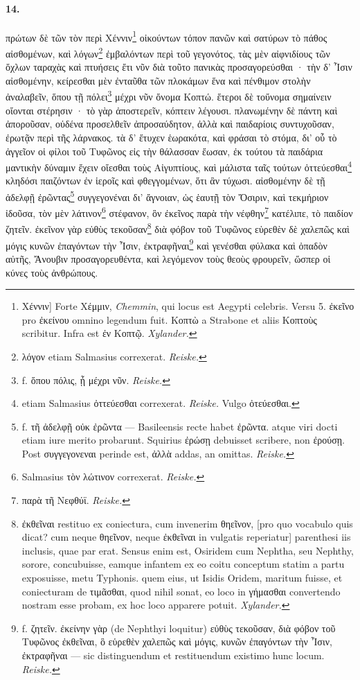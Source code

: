 \documentclass[a4paper, 11pt, oneside, polutonikogreek, german, landscape]{article}
\begin{document}
\paragraph{14.}
πρώτων δὲ τῶν τὸν περὶ Χέννιν\footnote{Χέννιν] Forte Χέμμιν, \emph{Chemmin}, qui locus est Aegypti celebris. Versu 5. ἐκεῖνο pro ἐκείνου omnino legendum fuit. Κοπτὼ a Strabone et aliis Κοπτοὺς scribitur. Infra est ἐν Κοπτῷ. \emph{Xylander.}} οἰκούντων τόπον πανῶν καὶ σατύρων τὸ πάθος αἰσθομένων, καὶ λόγων\footnote{λόγον etiam Salmasius correxerat. \emph{Reiske.}} ἐμβαλόντων περὶ τοῦ γεγονότος, τὰς μὲν αἰφνιδίους τῶν ὄχλων ταραχὰς καὶ πτυήσεις ἔτι νῦν διὰ τοῦτο πανικὰς προσαγορεύσθαι · τὴν δ' Ἶσιν αἰσθομένην, κείρεσθαι μὲν ἐνταῦθα τῶν πλοκάμων ἕνα καὶ πένθιμον στολὴν ἀναλαβεῖν, ὅπου τῇ πόλει\footnote{f. ὅπου πόλις, ᾗ μέχρι νῦν. \emph{Reiske.}} μέχρι νῦν ὄνομα Κοπτώ. ἕτεροι δὲ τοὔνομα σημαίνειν οἴονται στέρησιν · τὸ γὰρ ἀποστερεῖν, κόπτειν λέγουσι. πλανωμένην δὲ πάντη καὶ ἀποροῦσαν, οὐδένα προσελθεῖν ἀπροσαύδητον, ἀλλὰ καὶ παιδαρίοις συντυχοῦσαν, ἐρωτᾷν περὶ τῆς λάρνακος. τὰ δ' ἔτυχεν ἑωρακότα, καὶ φράσαι τὸ στόμα, δι' οὗ τὸ ἀγγεῖον οἱ φίλοι τοῦ Τυφῶνος εἰς τὴν θάλασσαν ἔωσαν, ἐκ τούτου τὰ παιδάρια μαντικὴν δύναμιν ἔχειν οἴεσθαι τοὺς Αἰγυπτίους, καὶ μάλιστα ταῖς τούτων ὀττεύεσθαι\footnote{etiam Salmasius ὀττεύεσθαι correxerat. \emph{Reiske.} Vulgo ὀτεύεσθαι.} κληδόσι παιζόντων ἐν ἱεροῖς καὶ φθεγγομένων, ὅτι ἂν τύχωσι. αἰσθομένην δὲ τῇ ἀδελφῇ ἐρῶντας\footnote{f. τῆ ἀδελφῇ οὐκ ἐρῶντα --- Basileensis recte habet ἐρῶντα. atque viri docti etiam iure merito probarunt. Squirius ἐρώσῃ debuisset scribere, non ἐρούσῃ. Post συγγεγονεναι perinde est, ἀλλὰ addas, an omittas. \emph{Reiske.}} συγγεγονέναι δι' ἄγνοιαν, ὡς ἑαυτῇ τὸν Ὄσιριν, καὶ τεκμήριον ἰδοῦσα, τὸν μὲν λάτινον\footnote{Salmasius τὸν λώτινον correxerat. \emph{Reiske.}} στέφανον, ὃν ἐκεῖνος παρὰ τὴν νέφθην\footnote{παρὰ τῆ Νεφθύϊ. \emph{Reiske.}} κατέλιπε, τὸ παιδίον ζητεῖν. ἐκεῖνον γὰρ εὐθὺς τεκοῦσαν\footnote{ἐκθεῖναι restituo ex coniectura, cum invenerim θηεῖνον, [pro quo vocabulo quis dicat? cum neque θηεῖνον, neque ἐκθεῖναι in vulgatis reperiatur] parenthesi iis inclusis, quae par erat. Sensus enim est, Osiridem cum Nephtha, seu Nephthy, sorore, concubuisse, eamque infantem ex eo coitu conceptum statim a partu exposuisse, metu Typhonis. quem eius, ut Isidis Oridem, maritum fuisse, et coniecturam de τιμᾶσθαι, quod nihil sonat, eo loco in γήμασθαι convertendo nostram esse probam, ex hoc loco apparere potuit. \emph{Xylander.}} διὰ φόβον τοῦ Τυφῶνος εὑρεθὲν δὲ χαλεπῶς καὶ μόγις κυνῶν ἐπαγόντων τὴν Ἶσιν, ἐκτραφῆναι\footnote{f. ζητεῖν. ἐκείνην γὰρ (de Nephthyi loquitur) εὐθὺς τεκοῦσαν, διὰ φόβον τοῦ Τυφῶνος ἐκθεῖναι, ὃ εὑρεθὲν χαλεπῶς καὶ μόγις, κυνῶν ἐπαγόντων τὴν Ἶσιν, ἐκτραφῆναι --- sic distinguendum et restituendum existimo hunc locum. \emph{Reiske.}} καὶ γενέσθαι φύλακα καὶ ὀπαδὸν αὐτῆς, Ἄνουβιν προσαγορευθέντα, καὶ λεγόμενον τοὺς θεοὺς φρουρεῖν, ὥσπερ οἱ κύνες τοὺς ἀνθρώπους.
\end{document}
